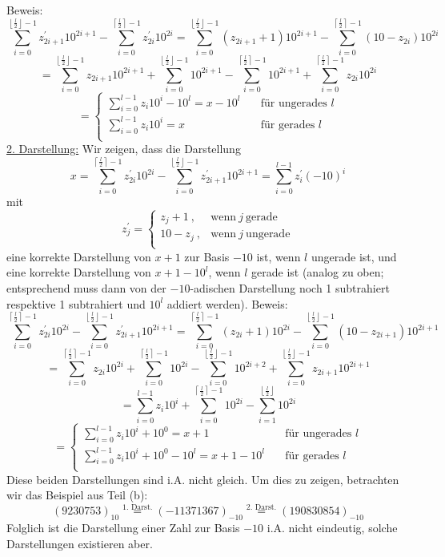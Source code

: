 \documentclass[11pt]{scrartcl}
\theoremstyle{dotless}
\newcommand{\floor}[1]{\left\lfloor #1\right\rfloor}
\newcommand{\ceil}[1]{\left\lceil #1\right\rceil}
\begin{document}
		Beweis:\newline
		$$\sum_{i=0}^{\floor{\frac{l}{2}}-1}z_{2i+1}^{\prime} 10^{2i+1}-\sum_{i=0}^{\ceil{\frac{l}{2}}-1}z_{2i}^{\prime} 10^{2i}=\sum_{i=0}^{\floor{\frac{l}{2}}-1}(z_{2i+1}+1) 10^{2i+1}-\sum_{i=0}^{\ceil{\frac{l}{2}}-1}(10-z_{2i})10^{2i}$$
		$$=\sum_{i=0}^{\floor{\frac{l}{2}}-1}z_{2i+1} 10^{2i+1}+\sum_{i=0}^{\floor{\frac{l}{2}}-1} 10^{2i+1}-\sum_{i=0}^{\ceil{\frac{l}{2}}-1} 10^{2i+1}+\sum_{i=0}^{\ceil{\frac{l}{2}}-1}z_{2i} 10^{2i}$$
		$$=\left\{\begin{array}{ll}
		\sum_{i=0}^{l-1}z_i10^i-10^{l}=x-10^{l}\quad&\text{für ungerades }l\\
		\sum_{i=0}^{l-1}z_i10^i=x\quad&\text{für gerades }l\\
		\end{array}\right.
		$$
		\underline{2. Darstellung:}\newline
		Wir zeigen, dass die Darstellung
		$$x=\sum_{i=0}^{\ceil{\frac{l}{2}}-1}z_{2i}^{\prime} 10^{2i}-\sum_{i=0}^{\floor{\frac{l}{2}}-1}z_{2i+1}^{\prime} 10^{2i+1}=\sum_{i=0}^{l-1}z_{i}^{\prime} (-10)^{i}$$
		mit
		$$z_j^{\prime}=\left\{\begin{array}{ll}
		z_j+1~,& \text{wenn}~j~ \text{gerade}\\
		10-z_j~,&\text{wenn}~j~ \text{ungerade}\\
		\end{array}\right.$$
		eine korrekte Darstellung von $x+1$ zur Basis $-10$ ist, wenn $l$ ungerade ist, und eine korrekte Darstellung von $x+1-10^l$, wenn $l$ gerade ist (analog zu oben; entsprechend muss dann von der $-10$-adischen Darstellung noch 1 subtrahiert respektive 1 subtrahiert und $10^l$ addiert werden).\newline
		Beweis:
		$$\sum_{i=0}^{\ceil{\frac{l}{2}}-1}z_{2i}^{\prime} 10^{2i}-\sum_{i=0}^{\floor{\frac{l}{2}}-1}z_{2i+1}^{\prime} 10^{2i+1}=\sum_{i=0}^{\ceil{\frac{l}{2}}-1}(z_{2i}+1) 10^{2i}-\sum_{i=0}^{\floor{\frac{l}{2}}-1}(10-z_{2i+1}) 10^{2i+1}$$
		$$=\sum_{i=0}^{\ceil{\frac{l}{2}}-1}z_{2i} 10^{2i} + \sum_{i=0}^{\ceil{\frac{l}{2}}-1} 10^{2i} - \sum_{i=0}^{\floor{\frac{l}{2}}-1} 10^{2i+2} + \sum_{i=0}^{\floor{\frac{l}{2}}-1}z_{2i+1} 10^{2i+1}$$
		$$=\sum_{i=0}^{l-1}z_i10^i + \sum_{i=0}^{\ceil{\frac{l}{2}}-1} 10^{2i} - 
		\sum_{i=1}^{\floor{\frac{l}{2}}} 10^{2i}$$
		$$=\left\{\begin{array}{ll}
		\sum_{i=0}^{l-1}z_i10^i+10^0=x+1\quad&\text{für ungerades }l\\
		\sum_{i=0}^{l-1}z_i10^i +10^0 - 10^l=x+1-10^l\quad&\text{für gerades }l\\
		\end{array}\right.
		$$
		Diese beiden Darstellungen sind i.A. nicht gleich. Um dies zu zeigen, betrachten wir das Beispiel aus Teil (b):
		$$(9230753)_{10}\overset{\text{1. Darst.}}{=}(-11371367)_{-10}\overset{\text{2. Darst.}}{=}(190830854)_{-10}$$
		Folglich ist die Darstellung einer Zahl zur Basis $-10$ i.A. nicht eindeutig, solche Darstellungen existieren aber.
\end{document}
